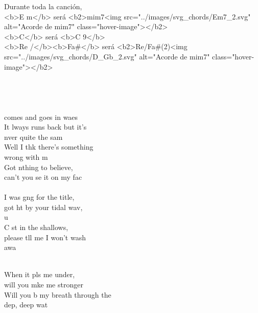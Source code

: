 \begin{cancion}%
Durante toda la canción, \\
<b>E m</b> será <b2>mim7<img src="../images/svg_chords/Em7_2.svg" alt="Acorde de mim7" class="hover-image"></b2>\\
<b>C</b>  será <b>C 9</b>\\
<b>Re /</b><b>Fa#</b> será <b2>Re/Fa#(2)<img src="../images/svg_chords/D_Gb_2.svg" alt="Acorde de mim7" class="hover-image"></b2>\\
	\jump\\
\jump\\
{}\vspace*{-0.4cm}\\
	           \\
	 comes and goes in waes\\
	It lways runs back but it's \\
	nver quite the sam\\
	Well I thk there's something \\
	wrong with m\\
	Got nthing to believe, \\
	can't you se it on my fac\\
\jump\\
	I was gng for the title, \\
	got ht by your tidal wav, \\
	u\\
	C st in the shallows, \\
	please tll me I won't wash\\
	 awa  \\\jump\\
	\begin{chorus}%
	When it pls me under, \\
	will you mke me stronger\\
	Will you b my breath through the \\
	dep, deep wat\\

\end{chorus}
\end{cancion}
